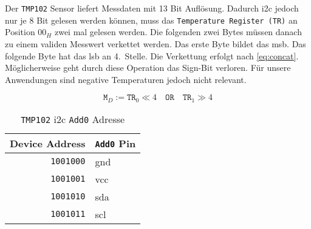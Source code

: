 Der \texttt{TMP102} Sensor liefert Messdaten mit 13 Bit Auflösung.
Dadurch \gls{i2c} jedoch nur je 8 Bit gelesen werden können, muss das \texttt{Temperature Register (TR)} an Position $00_H$ zwei mal gelesen werden.
Die folgenden zwei Bytes müssen danach zu einem validen Messwert verkettet werden.
Das erste Byte bildet das \gls{msb}.
Das folgende Byte hat das \gls{lsb} an 4.\ Stelle.
Die Verkettung erfolgt nach \autoref{eq:concat}.
Möglicherweise geht durch diese Operation das Sign-Bit verloren.
Für unsere Anwendungen sind negative Temperaturen jedoch nicht relevant.

\begin{equation}
    \texttt{M}_D := \texttt{TR}_0 \ll 4 \quad \texttt{OR} \quad \texttt{TR}_1 \gg 4
    \label{eq:concat}
\end{equation}

\begin{table}[h]
    \centering
    \begin{tabular}{|r|l|}
        \hline
        \textbf{Device Address} & \textbf{\texttt{Add0} Pin}\\
        \hline
        \hline
        \texttt{1001000} & \gls{gnd} \\
        \hline
        \texttt{1001001} & \gls{vcc} \\
        \hline
        \texttt{1001010} & \gls{sda} \\
        \hline
        \texttt{1001011} & \gls{scl} \\
        \hline
    \end{tabular}
    \caption{\texttt{TMP102} \gls{i2c} \texttt{Add0} Adresse}
    \label{tab:address}
\end{table}

